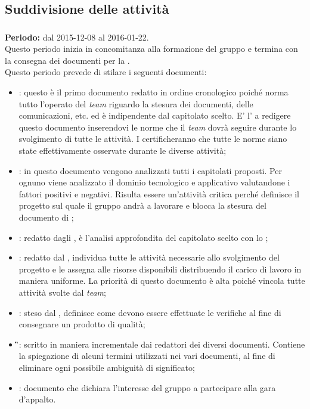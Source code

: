 \subsection{Suddivisione delle attività}

\subsubsection{\AR}
\textbf{Periodo:} dal 2015-12-08 al 2016-01-22.\\
Questo periodo inizia in concomitanza alla formazione del gruppo e termina con la consegna dei documenti per la \textit{\RR}.\\
Questo periodo prevede di stilare i seguenti documenti:
\begin{itemize}
		\item \textbf{\NdP}: questo è il primo documento redatto in ordine cronologico poiché norma tutto l'operato del \textit{team} riguardo la stesura dei documenti, delle comunicazioni, etc. ed è indipendente dal capitolato scelto. E' l’\textit{\Amm} a redigere questo documento inserendovi le norme che il \textit{team} dovrà seguire durante lo svolgimento di tutte le attività. I \textit{\Vers} certificheranno che tutte le norme siano state effettivamente osservate durante le diverse attività;
		\item \textbf{\SdF}: in questo documento vengono analizzati tutti i capitolati proposti. Per ognuno viene analizzato il dominio tecnologico e applicativo valutandone i fattori positivi e negativi. Risulta essere un'attività	critica perché definisce il progetto sul quale il gruppo andrà a lavorare e blocca la stesura del documento di \textit{\AdR};
		\item \textbf{\AdR}: redatto dagli \textit{\Anas}, è l'analisi approfondita del capitolato scelto con lo \textit{\SdF};
		\item \textbf{\PdP}: redatto dal \textit{\RdP}, individua tutte le attività necessarie allo svolgimento del progetto e le assegna alle risorse disponibili distribuendo il carico di lavoro in maniera uniforme.
		La priorità di questo documento è alta poiché vincola tutte attività svolte dal \textit{team};
		\item \textbf{\PdQ}: steso dal \textit{\Ver}, definisce come devono essere effettuate le verifiche al fine di consegnare un prodotto di qualità;
		\item \textbf{\G}: scritto in maniera incrementale dai redattori dei diversi documenti. Contiene la spiegazione di alcuni termini utilizzati nei vari documenti, al fine di eliminare ogni possibile ambiguità di significato;
		\item \textbf{\LdP}: documento che dichiara l’interesse del gruppo a partecipare alla gara d’appalto.
\end{itemize}
